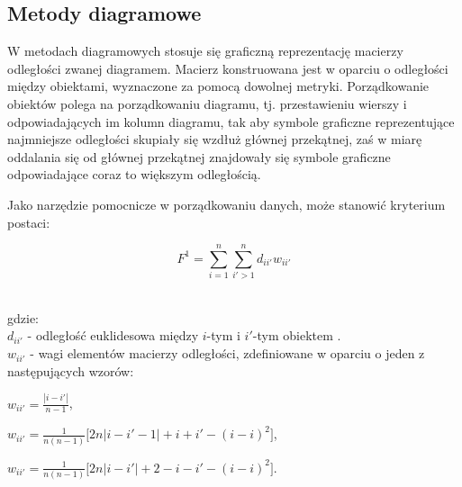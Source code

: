 \documentclass[12pt,a4paper]{report}
\begin{document}
\newpage
\subsection{Metody diagramowe}
\noindent

W metodach diagramowych stosuje się graficzną reprezentację macierzy odległości zwanej diagramem. Macierz konstruowana jest w oparciu o odległości między obiektami, wyznaczone za pomocą dowolnej metryki. Porządkowanie obiektów polega na porządkowaniu diagramu, tj. przestawieniu wierszy i odpowiadających im kolumn diagramu, tak aby symbole graficzne reprezentujące najmniejsze odległości skupiały się wzdłuż głównej przekątnej, zaś w miarę oddalania się od głównej przekątnej znajdowały się symbole graficzne odpowiadające coraz to większym odległością.  %


Jako narzędzie pomocnicze w porządkowaniu danych, może stanowić kryterium postaci:

\begin{center}
$$F^1= \sum_{i=1}^{n} \sum_{i'>1}^{n} d_{ii'}w_{ii'}$$\\
\end{center}
gdzie:\\
 $d_{ii'}$ - odległość euklidesowa między $i$-tym i $i'$-tym obiektem . \\
 $w_{ii'}$ - wagi elementów macierzy odległości, zdefiniowane w oparciu o jeden z następujących wzorów: \\
 
 \begin{center}
 
 $ w_{ii'}=\frac{| i-i' |}{n-1}$, $\qquad$ \\
   \end{center}
   \begin{center}
 $ w_{ii'}=\frac{1}{n(n-1)}\lbrack{2n|i-i'-1|+i+i'-(i-i)^2\rbrack}$,\\
 \end{center}
 \begin{center}
 $ w_{ii'}=\frac{1}{n(n-1)}\lbrack{2n|i-i'|+2-i-i'-(i-i)^2\rbrack}$.\\
\end{center}
\end{document}
